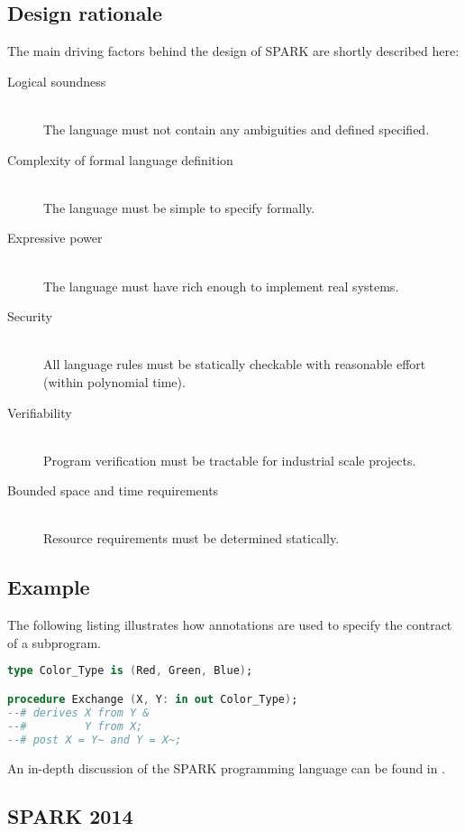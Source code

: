 \subsection{Design rationale}
The main driving factors behind the design of SPARK are shortly described here:

\begin{description}
	\item[Logical soundness] \hfill \\
		The language must not contain any ambiguities and defined specified.
	\item[Complexity of formal language definition] \hfill \\
		The language must be simple to specify formally.
	\item[Expressive power] \hfill \\
		The language must have rich enough to implement real systems.
	\item[Security] \hfill \\
		All language rules must be statically checkable with reasonable effort
		(within polynomial time).
	\item[Verifiability] \hfill \\
		Program verification must be tractable for industrial scale projects.
	\item[Bounded space and time requirements] \hfill \\
		Resource requirements must be determined statically.
\end{description}

\subsection{Example}
The following listing illustrates how annotations are used to specify the
contract of a subprogram.

\begin{lstlisting}[language=Ada]
type Color_Type is (Red, Green, Blue);

procedure Exchange (X, Y: in out Color_Type);
--# derives X from Y &
--#         Y from X;
--# post X = Y~ and Y = X~;
\end{lstlisting}

An in-depth discussion of the SPARK programming language can be found in
\cite{BarnesSPARK}.

\subsection{SPARK 2014}


